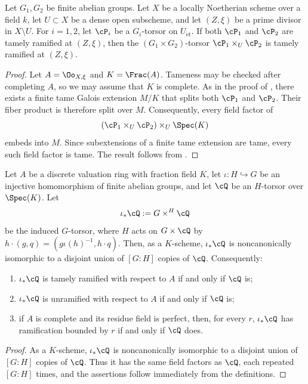 \begin{lemma}\label{lemma:ramification_of_fiber_product}
    Let $G_1,G_2$ be finite abelian groups. Let $X$ be a locally Noetherian
    scheme over a field $k$, let $U\subset X$ be a dense open subscheme, and
    let $(Z,\xi)$ be a prime divisor in $X\setminus U$. For $i=1,2$, let
    $\cP_i$ be a $G_i$-torsor on $U_{\mathrm{\acute et}}$. If both $\cP_1$ and
    $\cP_2$ are tamely ramified at $(Z,\xi)$, then the
    $(G_1\times G_2)$-torsor $\cP_1\times_U\cP_2$ is tamely ramified at
    $(Z,\xi)$.
\end{lemma}
\begin{proof}
    Let $A=\Oo_{X,\xi}$ and $K=\Frac(A)$. Tameness may be checked after
    completing $A$, so we may assume that $K$ is complete. As in the proof of
    , there exists a
    finite tame Galois extension $M/K$ that splits both $\cP_1$ and $\cP_2$.
    Their fiber product is therefore split over $M$. Consequently, every field
    factor of
    \[
        (\cP_1\times_U\cP_2)\times_U\Spec(K)
    \]
    embeds into $M$. Since subextensions of a finite tame extension are tame,
    every such field factor is tame. The result follows from
    .
\end{proof}

\begin{lemma}\label{lemma:ramification_of_induced_torsor}
    Let $A$ be a discrete valuation ring with fraction field $K$, let
    $\iota:H\hookrightarrow G$ be an injective homomorphism of finite abelian
    groups, and let $\cQ$ be an $H$-torsor over $\Spec(K)$. Let
    \[
        \iota_*\cQ:=G\times^H\cQ
    \]
    be the induced $G$-torsor, where $H$ acts on $G\times\cQ$ by
    $h\cdot(g,q)=(g\iota(h)^{-1},h\cdot q)$. Then, as a $K$-scheme,
    $\iota_*\cQ$ is noncanonically isomorphic to a disjoint union of $[G:H]$
    copies of $\cQ$. Consequently:
    \begin{enumerate}
        \item $\iota_*\cQ$ is tamely ramified with respect to $A$ if and only
        if $\cQ$ is;
        \item $\iota_*\cQ$ is unramified with respect to $A$ if and only if
        $\cQ$ is;
        \item if $A$ is complete and its residue field is perfect, then, for
        every $r$, $\iota_*\cQ$ has ramification bounded by $r$ if and only if
        $\cQ$ does.
    \end{enumerate}
\end{lemma}
\begin{proof}
    As a $K$-scheme, $\iota_*\cQ$ is noncanonically isomorphic to a disjoint
    union of $[G:H]$ copies of $\cQ$. Thus it has the same field factors as
    $\cQ$, each repeated $[G:H]$ times, and the assertions follow immediately
    from the definitions.
\end{proof}
